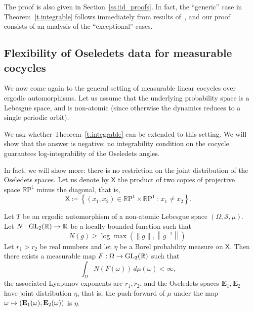 \documentclass[AHL,Unicode,longabstracts,published]{cedram}
\newcommand{\R}{\mathbb{R}}
\newcommand{\E}{\mathbf{E}}
\newcommand{\sfX}{\mathsf{X}}
\newcommand{\st}{\;\mathord{:}\;}
\newcommand{\clS}{\mathcal{S}}
\newcommand{\rmP}{\mathrm{P}}
\DeclareMathOperator{\GL}{GL}
\renewcommand*{\to}{\mathchoice{\longrightarrow}{\rightarrow}{\rightarrow}{\rightarrow}}
\let\oldmapsto\mapsto
\renewcommand*{\mapsto}{\mathchoice{\longmapsto}{\oldmapsto}{\oldmapsto}{\oldmapsto}}
\DeclareMathOperator{\GL}{GL}
\newcommand{\R}{\mathbb{R}}
\begin{document}
The proof is also given in Section~\ref{ss.iid_proofs}. In fact, the ``generic'' case in Theorem~\ref{t.integrable} follows immediately from results of~\cite{benoist-quint}, and our proof consists of an analysis of the ``exceptional'' cases.


\subsection{Flexibility of Oseledets data for measurable cocycles}

We now come again to the general setting of measurable linear cocycles over ergodic automorphisms. Let us assume that the underlying probability space is a Lebesgue space, and is non-atomic (since otherwise the dynamics reduces to a single periodic orbit).

We ask whether Theorem~\ref{t.integrable} can be extended to this setting. We will show that the answer is negative: no integrability condition on the cocycle guarantees log-integrability of the Oseledets angles.

In fact, we will show more: there is no restriction on the joint distribution of the Oseledets spaces. Let us denote by $\sfX$ the product of two copies of projective space $\R\rmP^1$ minus the diagonal, that is,
\begin{equation}\label{e.X}
\sfX \coloneqq \left\{(x_1,x_2) \in \R\rmP^1 \times \R\rmP^1 \st x_1 \neq x_2 \right\}.
\end{equation}

\begin{theo}\label{t.flexible}
Let $T$ be an ergodic automorphism of a non-atomic Lebesgue space $(\Omega,\clS,\mu)$. Let $N:\GL_2(\R) \to \R$ be a locally bounded function such that
\begin{equation}\label{e.lowerN}
N(g) \ge \log \max\left(\|g\|, \left\|g^{-1}\right\|\right).
\end{equation}
Let $r_1 > r_2$ be real numbers and let $\eta$ be a Borel probability measure on $\sfX$. Then there exists a measurable map $F:\Omega \to \GL_2(\R)$ such that
\begin{equation}\label{e.super-integrability}
\int_{\Omega} N(F(\omega)) \, d\mu(\omega) < \infty,
\end{equation}
the associated Lyapunov exponents are $r_1,r_2$, and the Oseledets spaces $\E_1,\E_2$ have joint distribution $\eta$, that is, the push-forward of $\mu$ under the map $\omega \mapsto (\E_1(\omega),\E_2(\omega))$ is $\eta$.
\end{theo}
\end{document}
